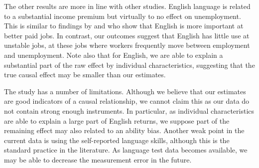 \documentclass[12pt, a4paper]{article}
\begin{document}
The other results are more in line with other studies.
English language is related to a substantial income premium but
virtually to no effect on unemployment.  This is similar to findings by
\citet{ginsburgh+prieto-rodriguez2011ILRR} and
\citet{beblavy+2016CEPS} who show that English is more important at better paid
jobs.  In contrast, our outcomes suggest that English has little use
at unstable jobs, at these jobs where workers frequently move between
employment and unemployment.
Note also that for
English, we are able to explain a substantial part of the raw effect
by individual characteristics, suggesting that the true causal effect
may be smaller than our estimates.

The study has a number of limitations.  Although we believe that our
estimates are good indicators of a causal relationship, we cannot 
claim this as our data do not contain strong enough instruments.
In particular, as individual characteristics are able to explain a
large part of English returns, we suppose part of the remaining effect
may also related to an ability bias.  Another weak point in the current
data is using the self-reported language
skills, although this is the standard practice in the literature.  As language test data becomes available, we may be able to
decrease the measurement error in the future.




\clearpage
\appendix


\listoffixmes
\end{document}
